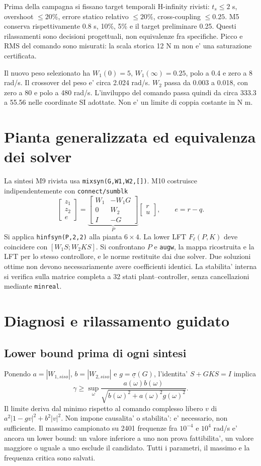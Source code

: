 Prima della campagna si fissano target temporali H-infinity rivisti:
$t_s\le2$ s, overshoot $\le20\%$, errore statico relativo $\le20\%$,
cross-coupling $\le0.25$. M5 conserva rispettivamente 0.8 s, 10\%, 5\%
e il target preliminare 0.25. Questi rilassamenti sono decisioni progettuali,
non equivalenze fra specifiche. Picco e RMS del comando sono misurati:
la scala storica 12 N m non e' una saturazione certificata.

Il nuovo peso selezionato ha $W_1(0)=5$, $W_1(\infty)=0.25$,
polo a 0.4 e zero a 8 rad/s. Il crossover del peso e' circa 2.024 rad/s.
$W_2$ passa da 0.003 a 0.018, con zero a 80 e polo a 480 rad/s.
L'inviluppo del comando passa quindi da circa 333.3 a 55.56 nelle
coordinate SI adottate. Non e' un limite di coppia costante in N m.

\section{Pianta generalizzata ed equivalenza dei solver}
La sintesi M9 rivista usa \texttt{mixsyn(G,W1,W2,[])}. M10 costruisce
indipendentemente con \texttt{connect/sumblk}
\[
\begin{bmatrix}z_1\\z_2\\e\end{bmatrix}
=\underbrace{\begin{bmatrix}W_1&-W_1G\\0&W_2\\I&-G\end{bmatrix}}_P
\begin{bmatrix}r\\u\end{bmatrix},\qquad e=r-q.
\]
Si applica \texttt{hinfsyn(P,2,2)} alla pianta $6\times4$. La lower LFT
$F_\ell(P,K)$ deve coincidere con $[W_1S;W_2KS]$.
Si confrontano $P$ e \texttt{augw}, la mappa ricostruita e la LFT per
lo stesso controllore, e le norme restituite dai due solver.
Due soluzioni ottime non devono necessariamente avere coefficienti identici.
La stabilita' interna si verifica sulla matrice completa a 32 stati
plant--controller, senza cancellazioni mediante \texttt{minreal}.

\section{Diagnosi e rilassamento guidato}
\subsection{Lower bound prima di ogni sintesi}
Ponendo $a=|W_{1,siso}|$, $b=|W_{2,siso}|$ e
$g=\underline\sigma(G)$, l'identita' $S+GKS=I$ implica
\[
\gamma\ge\sup_\omega
\frac{a(\omega)b(\omega)}{\sqrt{b(\omega)^2+a(\omega)^2g(\omega)^2}}.
\]
Il limite deriva dal minimo rispetto al comando complesso libero $v$
di $a^2|1-gv|^2+b^2|v|^2$. Non impone causalita' o stabilita':
e' necessario, non sufficiente. Il massimo campionato su 2401 frequenze
fra $10^{-4}$ e $10^4$ rad/s e' ancora un lower bound: un valore inferiore
a uno non prova fattibilita', un valore maggiore o uguale a uno esclude
il candidato. Tutti i parametri, il massimo e la frequenza critica sono salvati.

